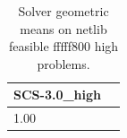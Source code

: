 \begin{table}
\caption{Solver geometric means on netlib feasible fffff800 high problems.}
\label{t-netlib feasible fffff800 high-geom_mean}
\begin{tabular}{lc}
\toprule
SCS-3.0_high \\
\midrule
1.00 \\
\bottomrule
\end{tabular}
\end{table}
